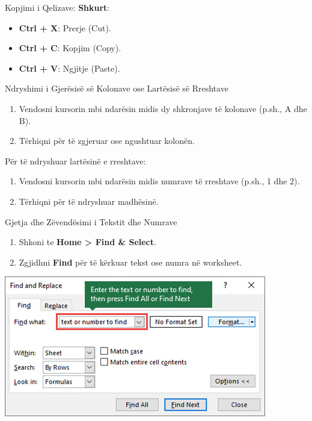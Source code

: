 \documentclass[
  ignorenonframetext,
]{beamer}
\providecommand{\tightlist}{%
  \setlength{\itemsep}{0pt}\setlength{\parskip}{0pt}}
\begin{document}
\begin{frame}{Kopjimi i Qelizave:}
\label{kopjimi-i-qelizave-1}
\textbf{Shkurt}:

\begin{itemize}
\tightlist
\item
  \textbf{Ctrl + X}: Prerje (Cut).\\
\item
  \textbf{Ctrl + C}: Kopjim (Copy).\\
\item
  \textbf{Ctrl + V}: Ngjitje (Paste).
\end{itemize}
\end{frame}

\begin{frame}{Ndryshimi i Gjerësisë së Kolonave ose Lartësisë së
Rreshtave}
\label{ndryshimi-i-gjeruxebsisuxeb-suxeb-kolonave-ose-lartuxebsisuxeb-suxeb-rreshtave}
\begin{enumerate}
\item
  Vendosni kursorin mbi ndarësin midis dy shkronjave të kolonave (p.sh.,
  A dhe B).
\item
  Tërhiqni për të zgjeruar ose ngushtuar kolonën.
\end{enumerate}
\end{frame}

\begin{frame}{Për të ndryshuar lartësinë e rreshtave:}
\label{puxebr-tuxeb-ndryshuar-lartuxebsinuxeb-e-rreshtave}
\begin{enumerate}
\item
  Vendosni kursorin mbi ndarësin midis numrave të rreshtave (p.sh., 1
  dhe 2).
\item
  Tërhiqni për të ndryshuar madhësinë.
\end{enumerate}
\end{frame}

\begin{frame}{Gjetja dhe Zëvendësimi i Tekstit dhe Numrave}
\label{gjetja-dhe-zuxebvenduxebsimi-i-tekstit-dhe-numrave}
\begin{enumerate}
\item
  Shkoni te \textbf{Home \textgreater{} Find \& Select}.
\item
  Zgjidhni \textbf{Find} për të kërkuar tekst ose numra në worksheet.
\end{enumerate}

\includegraphics{./images/excel10.jpg}
\end{frame}
\end{document}
